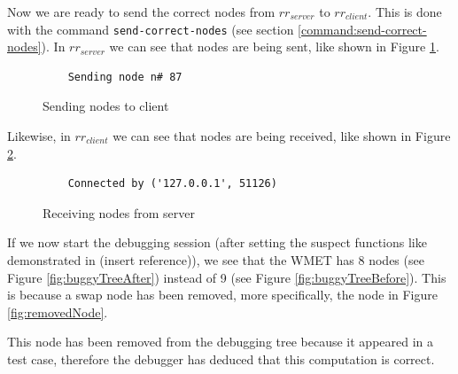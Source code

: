 Now we are ready to send the correct nodes from \(rr_{server}\) to \(rr_{client}\). This is done with the command \verb|send-correct-nodes| (see section \ref{command:send-correct-nodes}).
In \(rr_{server}\) we can see that nodes are being sent, like shown in Figure \ref{fig:sendingNode}.
\begin{figure}[h]
    \centering
    \caption{Sending nodes to client}
    \label{fig:sendingNode}
    \begin{verbatim}
    Sending node n# 87
    \end{verbatim}
\end{figure}
Likewise, in \(rr_{client}\) we can see that nodes are being received, like shown in Figure \ref{fig:receivingNode}.
\begin{figure}[h]
    \centering
    \caption{Receiving nodes from server}
    \label{fig:receivingNode}
    \begin{verbatim}
    Connected by ('127.0.0.1', 51126)
    \end{verbatim}
\end{figure}

If we now start the debugging session (after setting the suspect functions like demonstrated in (insert reference)), we see that the WMET has 8 nodes (see Figure \ref{fig:buggyTreeAfter}) instead of 9 (see Figure \ref{fig:buggyTreeBefore}). This is because a swap node has been removed, more specifically, the node in Figure \ref{fig:removedNode}.

This node has been removed from the debugging tree because it appeared in a test case, therefore the debugger has deduced that this computation is correct.

